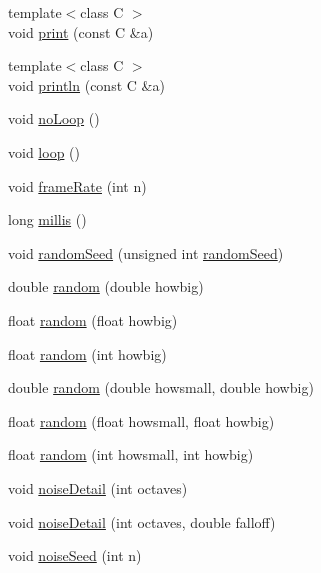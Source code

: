 \begin{DoxyCompactItemize}
\item 
{\footnotesize template$<$class C $>$ }\\void \hyperlink{namespacecprocessing_a2ce567d9c23f93c9de2ec5b5b362c750}{print} (const \-C \&a)
\item 
{\footnotesize template$<$class C $>$ }\\void \hyperlink{namespacecprocessing_adb24a9653ec0c180336385d1c006a658}{println} (const \-C \&a)
\item 
void \hyperlink{namespacecprocessing_aec8195139a88226bc60d3eddaa5d65b9}{no\-Loop} ()
\item 
void \hyperlink{namespacecprocessing_a66554fc7a3370552f74c563d0c5adcef}{loop} ()
\item 
void \hyperlink{namespacecprocessing_a09d66ead6ff18c18aa353ee6ed50bb78}{frame\-Rate} (int n)
\item 
long \hyperlink{namespacecprocessing_ad302883a6ce30f331258927090bf924a}{millis} ()
\item 
void \hyperlink{namespacecprocessing_a71cb5d974435b9aff63bab3fd9e47b2c}{random\-Seed} (unsigned int \hyperlink{namespacecprocessing_a71cb5d974435b9aff63bab3fd9e47b2c}{random\-Seed})
\item 
double \hyperlink{namespacecprocessing_af80d5416f0be7b44024b66fdab375cf5}{random} (double howbig)
\item 
float \hyperlink{namespacecprocessing_a4254fb2e188dcbfc114392750df85469}{random} (float howbig)
\item 
float \hyperlink{namespacecprocessing_a874dc56fc0d6e65a1b13e40e2c88d367}{random} (int howbig)
\item 
double \hyperlink{namespacecprocessing_acbb34da5bbdcb90c835f747da782164a}{random} (double howsmall, double howbig)
\item 
float \hyperlink{namespacecprocessing_a4acf597a7eba6baff6bb2dfceb44e91b}{random} (float howsmall, float howbig)
\item 
float \hyperlink{namespacecprocessing_aff94df2ca686ab8cb8c29e06f06c41c8}{random} (int howsmall, int howbig)
\item 
void \hyperlink{namespacecprocessing_a4eeb81f5fead851fd3a5fa23286b8b99}{noise\-Detail} (int octaves)
\item 
void \hyperlink{namespacecprocessing_ac2ffd86761a271d29697d6408a125e59}{noise\-Detail} (int octaves, double falloff)
\item 
void \hyperlink{namespacecprocessing_a018a4f19c47283bd51f6c0004bdbaa78}{noise\-Seed} (int n)
\item 

\end{DoxyCompactItemize}
